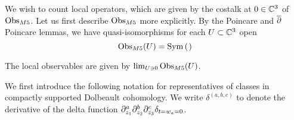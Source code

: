 \documentclass[11pt]{amsart}
\begin{document}
%

We wish to count local operators, which are given by the costalk at $0\in \mathbb{C}^{3}$ of ${\rm Obs}_{M5}$. Let us first describe ${\rm Obs}_{M5}$ more explicitly. By the Poincare and $\overline{\partial}$ Poincare lemmas, we have quasi-isomorphisms for each $U\subset \mathbb{C}^{3}$ open
\[
\Obs_{M5}(U) = \Sym \left( \begin{tikzcd}  \end{tikzcd} \right)
\]

The local observables are given by $\lim _{U\ni 0} {\rm Obs}_{M5}(U)$.

We first introduce the following notation for representatives of classes in compactly supported Dolbeault cohomology. We write $\delta^{(a,b,c)}$ to denote the derivative of the delta function $\partial_{z_{1}}^{a}\partial_{z_{2}}^{b}\partial_{z_{3}}^{c}\delta_{t=w_{a}=0}$.
\end{document}

